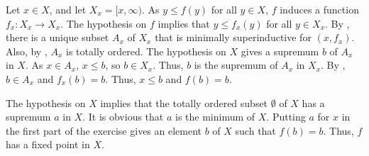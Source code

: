 \documentclass{article}
\begin{document}
\begin{solution}[\ref{exe:al7fffh1}]
  \label{sol:ibjwlmqf}
  Let \(x \in X\), and let \(X_x = [x, \infty)\).  As \(y \leq f(y)\)
  for all \(y \in X\), \(f\) induces a function \(f_x : X_x \to X_x\).
  The hypothesis on \(f\) implies that \(y \leq f_x(y)\) for all
  \(y \in X_x\).  By , there is a unique subset
  \(A_x\) of \(X_x\) that is minimally superinductive for
  \((x, f_x)\).  Also, by , \(A_x\) is totally
  ordered.  The hypothesis on \(X\) gives a supremum \(b\) of \(A_x\)
  in \(X\).  As \(x \in A_x\), \(x \leq b\), so \(b \in X_x\).  Thus,
  \(b\) is the supremum of \(A_x\) in \(X_x\).  By
  , \(b \in A_x\) and \(f_x(b) = b\).  Thus,
  \(x \leq b\) and \(f(b) = b\).

  The hypothesis on \(X\) implies that the totally ordered subset
  \(\emptyset\) of \(X\) has a supremum \(a\) in \(X\).  It is obvious
  that \(a\) is the minimum of \(X\).  Putting \(a\) for \(x\) in the
  first part of the exercise gives an element \(b\) of \(X\) such that
  \(f(b) = b\).  Thus, \(f\) has a fixed point in \(X\).
\end{solution}
\end{document}
